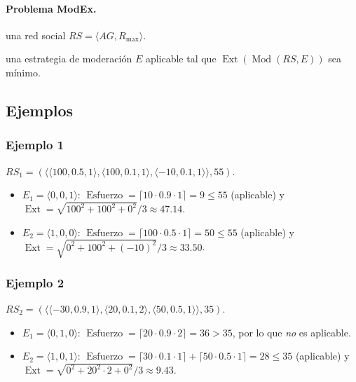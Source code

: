 \documentclass[11pt,letterpaper]{article}
\newcommand{\RS}{\mathit{RS}}
\newcommand{\Rmax}{R_{\max}}
\newcommand{\Ext}{\operatorname{Ext}}
\newcommand{\Esf}{\operatorname{Esfuerzo}}
\newcommand{\Mod}{\operatorname{Mod}}
\begin{document}
\paragraph{Problema ModEx.}
\begin{description}[leftmargin=2cm]
  \item[Entrada:] una red social $\RS = \langle AG, \Rmax \rangle$.
  \item[Salida:] una estrategia de moderación $E$ aplicable tal que
        $\Ext(\Mod(\RS, E))$ sea mínimo.
\end{description}

\subsection{Ejemplos}
\label{sec:ejemplos}

\subsubsection*{Ejemplo 1}
$\RS_1 = (\langle\langle 100, 0.5, 1\rangle, \langle 100, 0.1, 1\rangle,
\langle -10, 0.1, 1\rangle\rangle, 55)$.

\begin{itemize}
  \item $E_1 = \langle 0,0,1 \rangle$:
        $\Esf = \lceil 10 \cdot 0.9 \cdot 1 \rceil = 9 \le 55$ (aplicable) y
        $\Ext = \sqrt{100^2 + 100^2 + 0^2}/3 \approx 47.14$.
  \item $E_2 = \langle 1,0,0 \rangle$:
        $\Esf = \lceil 100 \cdot 0.5 \cdot 1 \rceil = 50 \le 55$ (aplicable) y
        $\Ext = \sqrt{0^2 + 100^2 + (-10)^2}/3 \approx 33.50$.
\end{itemize}

\subsubsection*{Ejemplo 2}
$\RS_2 = (\langle\langle -30, 0.9, 1\rangle, \langle 20, 0.1, 2\rangle,
\langle 50, 0.5, 1\rangle\rangle, 35)$.

\begin{itemize}
  \item $E_1 = \langle 0,1,0 \rangle$:
        $\Esf = \lceil 20 \cdot 0.9 \cdot 2 \rceil = 36 > 35$, por lo que
        \emph{no} es aplicable.
  \item $E_2 = \langle 1,0,1 \rangle$:
        $\Esf = \lceil 30 \cdot 0.1 \cdot 1 \rceil + \lceil 50 \cdot 0.5 \cdot 1 \rceil
        = 28 \le 35$ (aplicable) y
        $\Ext = \sqrt{0^2 + 20^2 \cdot 2 + 0^2}/3 \approx 9.43$.
\end{itemize}
\end{document}
